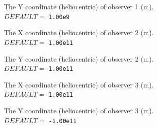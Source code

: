 \documentclass[12pt,a4paper]{article}
\begin{document}
  \vspace{0.5cm}

  \setlength{\temptextwidth}{\textwidth}  
  \addtolength{\temptextwidth}{-1.0\parindent} 
    
    \parbox[t]{\temptextwidth}{The Y coordinate (heliocentric) of observer 1 (m). \\ 
                               $DEFAULT=$ {\tt 1.00e9}}

  \vspace{0.5cm}

  \setlength{\temptextwidth}{\textwidth}  
  \addtolength{\temptextwidth}{-1.0\parindent} 
    
    \parbox[t]{\temptextwidth}{The X coordinate (heliocentric) of observer 2 (m). \\ 
                               $DEFAULT=$ {\tt 1.00e11}}

  \vspace{0.5cm}

  \setlength{\temptextwidth}{\textwidth}   
  \addtolength{\temptextwidth}{-1.0\parindent} 
    
    \parbox[t]{\temptextwidth}{The Y coordinate (heliocentric) of observer 2 (m). \\ 
                               $DEFAULT=$ {\tt 1.00e11}}

  \vspace{0.5cm}

  \setlength{\temptextwidth}{\textwidth}  
  \addtolength{\temptextwidth}{-1.0\parindent} 
    
    \parbox[t]{\temptextwidth}{The X coordinate (heliocentric) of observer 3 (m). \\ 
                               $DEFAULT=$ {\tt 1.00e11}}

  \vspace{0.5cm}

  \setlength{\temptextwidth}{\textwidth}  
  \addtolength{\temptextwidth}{-1.0\parindent} 
    
    \parbox[t]{\temptextwidth}{The Y coordinate (heliocentric) of observer 3 (m). \\ 
                               $DEFAULT=$ {\tt -1.00e11}}

  \vspace{0.5cm}

  \setlength{\temptextwidth}{\textwidth}  
  \addtolength{\temptextwidth}{-1.0\parindent} 
    
\end{document}

